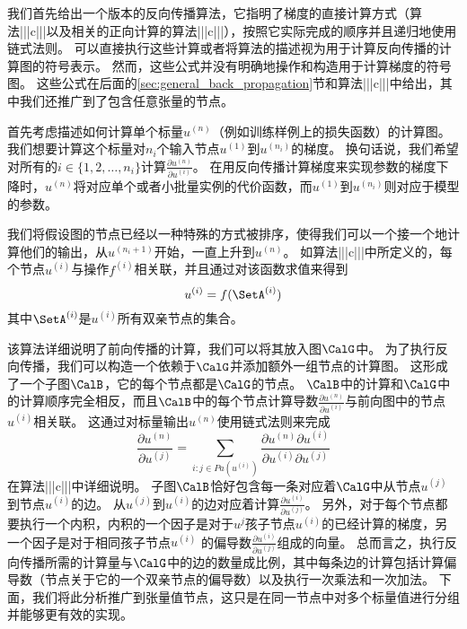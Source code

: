 我们首先给出一个版本的反向传播算法，它指明了梯度的直接计算方式（算法|||c|||以及相关的正向计算的算法|||c|||），按照它实际完成的顺序并且递归地使用链式法则。
可以直接执行这些计算或者将算法的描述视为用于计算反向传播的计算图的符号表示。
然而，这些公式并没有明确地操作和构造用于计算梯度的符号图。
这些公式在后面的\ref{sec:general_back_propagation}节和算法|||c|||中给出，其中我们还推广到了包含任意张量的节点。

首先考虑描述如何计算单个标量$u^{(n)}$（例如训练样例上的损失函数）的计算图。
我们想要计算这个标量对$n_i$个输入节点$u^{(1)}$到$u^{(n_i)}$的梯度。
换句话说，我们希望对所有的$i\in\{1,2,\ldots,n_i\}$计算$\frac{\partial u^{(n)}}{\partial u^{(i)}}$。
在用反向传播计算梯度来实现参数的梯度下降时，$u^{(n)}$将对应单个或者小批量实例的代价函数，而$u^{(1)}$到$u^{(n_i)}$则对应于模型的参数。


我们将假设图的节点已经以一种特殊的方式被排序，使得我们可以一个接一个地计算他们的输出，从$u^{(n_i+1)}$开始，一直上升到$u^{(n)}$。
如算法|||c|||中所定义的，每个节点$u^{(i)}$与操作$f^{(i)}$相关联，并且通过对该函数求值来得到
\begin{equation}
  u^{(i)} = f(\SetA^{(i)})
\end{equation}
其中$\SetA^{(i)}$是$u^{(i)}$所有双亲节点的集合。


该算法详细说明了前向传播的计算，我们可以将其放入图$\CalG$中。
为了执行反向传播，我们可以构造一个依赖于$\CalG$并添加额外一组节点的计算图。
这形成了一个子图$\CalB$，它的每个节点都是$\CalG$的节点。
$\CalB$中的计算和$\CalG$中的计算顺序完全相反，而且$\CalB$中的每个节点计算导数$\frac{\partial u^{(n)}}{\partial u^{(i)}}$与前向图中的节点$u^{(i)}$相关联。
这通过对标量输出$u^{(n)}$使用链式法则来完成
\begin{equation}
  \frac{\partial u^{(n)}}{\partial u^{(j)}} = \sum_{i:j \in Pa(u^{(i)})} \frac{\partial u^{(n)} \partial u^{(i)}}{ \partial u^{(i)} \partial u^{(j)} }
  \label{eq:6.49}
\end{equation}
在算法|||c|||中详细说明。
子图$\CalB$恰好包含每一条对应着$\CalG$中从节点$u^{(j)}$到节点$u^{(i)}$的边。
从$u^{(j)}$到$u^{(i)}$的边对应着计算$\frac{\partial u^{(i)}}{\partial u^{(j)}}$。
另外，对于每个节点都要执行一个内积，内积的一个因子是对于$u^{j}$孩子节点$u^{(i)}$的已经计算的梯度，另一个因子是对于相同孩子节点$u^{(i)}$ 的偏导数$\frac{\partial u^{(i)}}{\partial u^{(j)}}$组成的向量。
总而言之，执行反向传播所需的计算量与$\CalG$中的边的数量成比例，其中每条边的计算包括计算偏导数（节点关于它的一个双亲节点的偏导数）以及执行一次乘法和一次加法。
下面，我们将此分析推广到张量值节点，这只是在同一节点中对多个标量值进行分组并能够更有效的实现。

